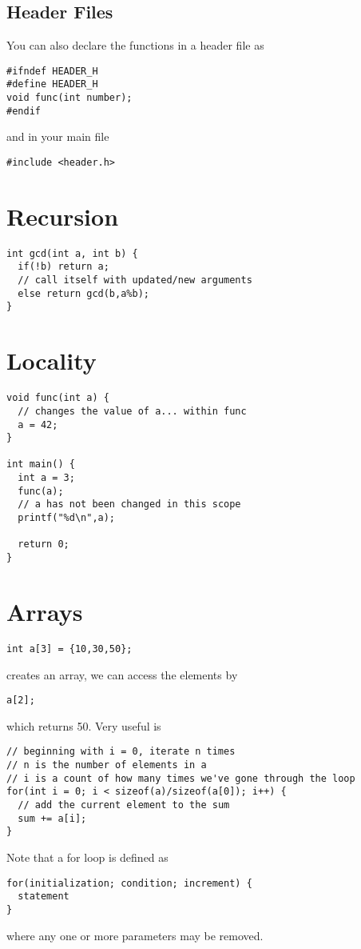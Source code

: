 \documentclass[12pt]{article}
\begin{document}
\subsection*{Header Files}
You can also declare the functions in a header file as
\begin{verbatim}
#ifndef HEADER_H
#define HEADER_H
void func(int number);
#endif
\end{verbatim}
and in your main file \begin{verbatim}#include <header.h>\end{verbatim}

\section*{Recursion}
\begin{verbatim}
int gcd(int a, int b) {
  if(!b) return a;
  // call itself with updated/new arguments
  else return gcd(b,a%b);
}
\end{verbatim}

\section*{Locality}
\begin{verbatim}
void func(int a) {
  // changes the value of a... within func
  a = 42;
}

int main() {
  int a = 3;
  func(a);
  // a has not been changed in this scope
  printf("%d\n",a);

  return 0;
}
\end{verbatim}

\section*{Arrays}
\begin{verbatim}int a[3] = {10,30,50};\end{verbatim} creates an array, we can access the elements by \begin{verbatim}a[2];\end{verbatim} which returns 50. Very useful is
\begin{verbatim}
// beginning with i = 0, iterate n times
// n is the number of elements in a
// i is a count of how many times we've gone through the loop
for(int i = 0; i < sizeof(a)/sizeof(a[0]); i++) {
  // add the current element to the sum
  sum += a[i];
}
\end{verbatim}

Note that a for loop is defined as
\begin{verbatim}
for(initialization; condition; increment) {
  statement
}
\end{verbatim}
where any one or more parameters may be removed.
\end{document}
